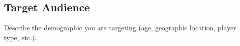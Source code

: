 \subsection{Target Audience}

Describe the demographic you are targeting (age, geographic location, player type, etc.).






\pagebreak